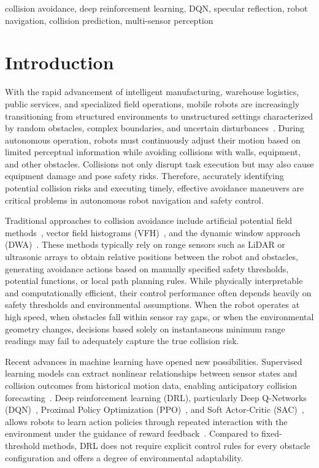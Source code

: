 \documentclass[conference]{IEEEtran}
\begin{document}
\begin{IEEEkeywords}
collision avoidance, deep reinforcement learning, DQN, specular reflection, robot navigation, collision prediction, multi-sensor perception
\end{IEEEkeywords}

\section{Introduction}

With the rapid advancement of intelligent manufacturing, warehouse logistics, public services, and specialized field operations, mobile robots are increasingly transitioning from structured environments to unstructured settings characterized by random obstacles, complex boundaries, and uncertain disturbances~\cite{siegwart2011introduction}. During autonomous operation, robots must continuously adjust their motion based on limited perceptual information while avoiding collisions with walls, equipment, and other obstacles. Collisions not only disrupt task execution but may also cause equipment damage and pose safety risks. Therefore, accurately identifying potential collision risks and executing timely, effective avoidance maneuvers are critical problems in autonomous robot navigation and safety control.

Traditional approaches to collision avoidance include artificial potential field methods~\cite{khatib1986real}, vector field histograms (VFH)~\cite{borenstein1991vector}, and the dynamic window approach (DWA)~\cite{fox1997dynamic}. These methods typically rely on range sensors such as LiDAR or ultrasonic arrays to obtain relative positions between the robot and obstacles, generating avoidance actions based on manually specified safety thresholds, potential functions, or local path planning rules. While physically interpretable and computationally efficient, their control performance often depends heavily on safety thresholds and environmental assumptions. When the robot operates at high speed, when obstacles fall within sensor ray gaps, or when the environmental geometry changes, decisions based solely on instantaneous minimum range readings may fail to adequately capture the true collision risk.

Recent advances in machine learning have opened new possibilities. Supervised learning models can extract nonlinear relationships between sensor states and collision outcomes from historical motion data, enabling anticipatory collision forecasting~\cite{kahn2017self}. Deep reinforcement learning (DRL), particularly Deep Q-Networks (DQN)~\cite{mnih2015human}, Proximal Policy Optimization (PPO)~\cite{schulman2017proximal}, and Soft Actor-Critic (SAC)~\cite{haarnoja2018soft}, allows robots to learn action policies through repeated interaction with the environment under the guidance of reward feedback~\cite{tai2017virtual, zhu2017target}. Compared to fixed-threshold methods, DRL does not require explicit control rules for every obstacle configuration and offers a degree of environmental adaptability.
\end{document}

